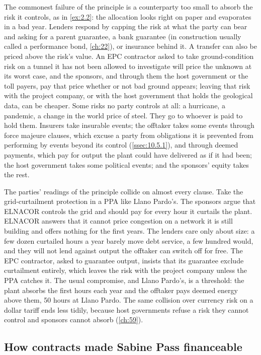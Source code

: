 The commonest failure of the principle is a counterparty too small to absorb the risk it controls, as in \cref{ex:2.2}: the allocation looks right on paper and evaporates in a bad year. Lenders respond by capping the risk at what the party can bear and asking for a parent guarantee, a bank guarantee (in construction usually called a performance bond, \cref{ch:22}), or insurance behind it. A transfer can also be priced above the risk's value. An EPC contractor asked to take ground-condition risk on a tunnel it has not been allowed to investigate will price the unknown at its worst case, and the sponsors, and through them the host government or the toll payers, pay that price whether or not bad ground appears; leaving that risk with the project company, or with the host government that holds the geological data, can be cheaper. Some risks no party controls at all: a hurricane, a pandemic, a change in the world price of steel. They go to whoever is paid to hold them. Insurers take insurable events; the offtaker takes some events through force majeure clauses, which excuse a party from obligations it is prevented from performing by events beyond its control (\cref{ssec:10.5.1}), and through deemed payments, which pay for output the plant could have delivered as if it had been; the host government takes some political events; and the sponsors' equity takes the rest.

The parties' readings of the principle collide on almost every clause. Take the grid-curtailment protection in a PPA like Llano Pardo's. The sponsors argue that ELNACOR controls the grid and should pay for every hour it curtails the plant. ELNACOR answers that it cannot price congestion on a network it is still building and offers nothing for the first years. The lenders care only about size: a few dozen curtailed hours a year barely move debt service, a few hundred would, and they will not lend against output the offtaker can switch off for free. The EPC contractor, asked to guarantee output, insists that its guarantee exclude curtailment entirely, which leaves the risk with the project company unless the PPA catches it. The usual compromise, and Llano Pardo's, is a threshold: the plant absorbs the first hours each year and the offtaker pays deemed energy above them, 50 hours at Llano Pardo. The same collision over currency risk on a dollar tariff ends less tidily, because host governments refuse a risk they cannot control and sponsors cannot absorb (\cref{ch:59}).

\subsection{How contracts made Sabine Pass financeable}\label{ssec:2.3.3}

